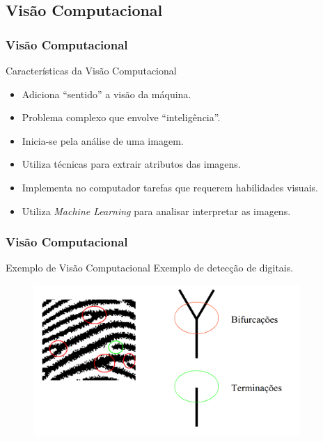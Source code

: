 \documentclass{beamer}
\begin{document}
\subsection{Visão Computacional}

\begin{frame}
\frametitle{Visão Computacional}
	\begin{block}{Características da Visão Computacional}
	
		\begin{itemize}
			\item<1-> Adiciona ``sentido'' a visão da máquina.
			\item<2-> Problema complexo que envolve ``inteligência''.
			\item<3-> Inicia-se pela análise de uma imagem. 
			\item<4-> Utiliza técnicas para extrair atributos das imagens.
			\item<5-> Implementa no computador tarefas que requerem habilidades visuais. 
			\item<6-> Utiliza \textit{Machine Learning} para analisar interpretar as imagens.
		\end{itemize}
	\end{block}
\end{frame}



\begin{frame}
\frametitle{Visão Computacional}
	\begin{block}{Exemplo de Visão Computacional}
		Exemplo de detecção de digitais.
	\end{block}
	\begin{figure}[!h]
		\begin{center}
			\includegraphics[width=0.9\textwidth]{Figures/bifdigitais}
		\end{center}
		
	\end{figure}
	
\end{frame}
\end{document}
